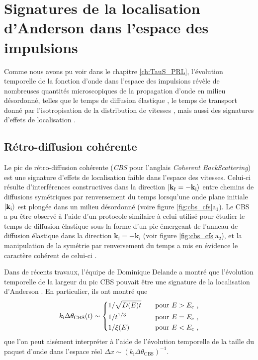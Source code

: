 \section{Signatures de la localisation d'Anderson dans l'espace des impulsions}
Comme nous avons pu voir dans le chapitre \ref{ch:TauS_PRL}, l'évolution temporelle de la fonction d'onde dans l'espace des impulsions révèle de nombreuses quantités microscopiques de la propagation d'onde en milieu désordonné, telles que le temps de diffusion élastique \citep{richard2019elastic}, le temps de transport donné par l'isotropisation de la distribution de vitesses \citep{plisson2013momentum}, mais aussi des signatures d'effets de localisation \citep{cherroret2012coherent}.

\subsection{Rétro-diffusion cohérente}
Le pic de rétro-diffusion cohérente (\emph{CBS} pour l'anglais \emph{Coherent BackScattering}) est une signature d'effets de localisation faible dans l'espace des vitesses. Celui-ci résulte d'interférences constructives dans la direction $\left| \mathbf{k}_{\mathrm{f}}=-\mathbf{k}_{\mathrm{i}} \right\rangle$ entre chemins de diffusions symétriques par renversement du temps lorsqu'une onde plane initiale $\left| \mathbf{k}_{\mathrm{i}} \right\rangle$ est plongée dans un milieu désordonné (voire figure \ref{fig:cbs_cfs}$\mathrm{a_1}$). Le CBS a pu être observé à l'aide d'un protocole similaire à celui utilisé pour étudier le temps de diffusion élastique \citep{jendrzejewski2012coherent} sous la forme d'un pic émergeant de l'anneau de diffusion élastique dans la direction $\mathbf{k}_{\mathrm{f}}=-\mathbf{k}_{\mathrm{i}}$ (voir figure \ref{fig:cbs_cfs}$\mathrm{a_2}$), et la manipulation de la symétrie par renversement du temps a mis en évidence le caractère cohérent de celui-ci \citep{muller2015suppression}.

Dans de récents travaux, l'équipe de Dominique Delande a montré que l'évolution temporelle de la largeur du pic CBS pouvait être une signature de la localisation d'Anderson \citep{ghosh2015coherent}. En particulier, ils ont montré que 
\begin{equation}
k_{\mathrm{i}} \Delta\theta_{\mathrm{CBS}}(t) \sim \left\lbrace \begin{aligned}
& 1/\sqrt{D(E)t}  \quad &&\text{pour } E>E_{\mathrm{c}} \text{ ,}\\
& 1/t^{1/3} \quad &&\text{pour } E=E_{\mathrm{c}} \text{ ,}\\
& 1/\xi(E) \quad &&\text{pour } E<E_{\mathrm{c}} \text{ ,}
\end{aligned}\right.
\label{eq:largeur_cbs}
\end{equation}
que l'on peut aisément interpréter à l'aide de l'évolution temporelle de la taille du paquet d'onde dans l'espace réel $\Delta x\sim (k_{\mathrm{i}} \Delta \theta_{\mathrm{CBS}})^{-1}$.

